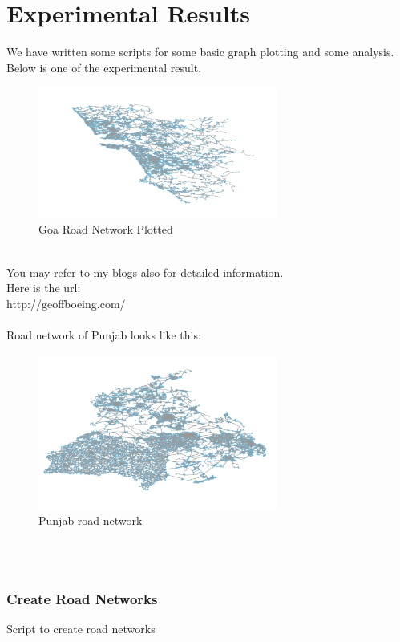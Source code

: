 
\section{Experimental Results}
We have written some scripts for some basic graph plotting and some analysis.\\
Below is one of the experimental result.\\
\begin{figure}[!ht]
	\centering
	\includegraphics[width=0.7\textwidth]{input/images/plot1.jpg}              
	\caption{Goa Road Network Plotted}
	\hspace{-1.5em}
\end{figure}\\
You may refer to my blogs also for detailed information.\\
Here is the url: \\
http://geoffboeing.com/ \\\\
Road network of Punjab looks like this:
\begin{figure}[!ht]
	\centering
	\includegraphics[width=0.7\textwidth]{input/images/p.jpg}                
	\caption{Punjab road network}
	\hspace{-1.5em}
\end{figure}\\\\
\subsubsection{Create Road Networks}
Script to create road networks

